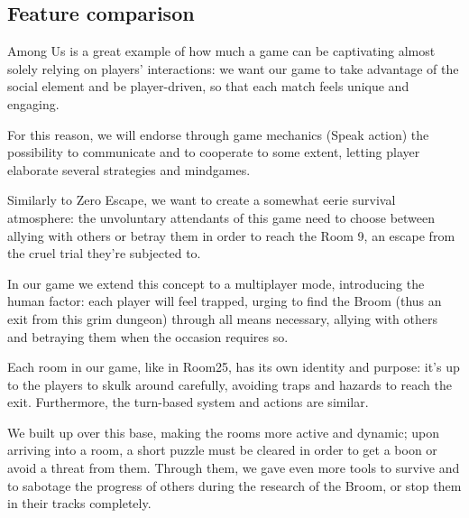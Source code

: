 \subsection{Feature comparison}


Among Us is a great example of how much a game can be captivating almost solely relying on players' interactions: we want our game to take advantage of the social element and be player-driven, so that each match feels unique and engaging.


\noindent For this reason, we will endorse through game mechanics (Speak action) the possibility to communicate and to cooperate to some extent, letting player elaborate several strategies and mindgames.

\clearpage


Similarly to Zero Escape, we want to create a somewhat eerie survival atmosphere: the unvoluntary attendants of this game need to choose between allying with others or betray them in order to reach the Room 9, an escape from the cruel trial they're subjected to.


\noindent In our game we extend this concept to a multiplayer mode, introducing the human factor: each player will feel trapped, urging to find the Broom (thus an exit from this grim dungeon) through all means necessary, allying with others and betraying them when the occasion requires so.

\clearpage


Each room in our game, like in Room25, has its own identity and purpose: it's up to the players to skulk around carefully, avoiding traps and hazards to reach the exit. Furthermore, the turn-based system and actions are similar.


\noindent We built up over this base, making the rooms more active and dynamic; upon arriving into a room, a short puzzle must be cleared in order to get a boon or avoid a threat from them. Through them, we gave even more tools to survive and to sabotage the progress of others during the research of the Broom, or stop them in their tracks completely.

\clearpage